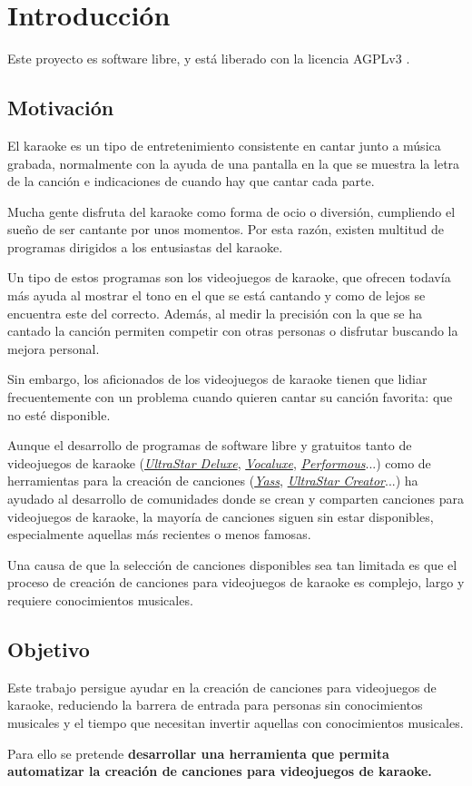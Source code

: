 \chapter{Introducción}

Este proyecto es software libre, y está liberado con la licencia AGPLv3 \cite{agpl}.

\section{Motivación}

El karaoke es un tipo de entretenimiento consistente en cantar junto a música grabada, normalmente con la ayuda de una pantalla en la que se muestra la letra de la canción e indicaciones de cuando hay que cantar cada parte.

Mucha gente disfruta del karaoke como forma de ocio o diversión, cumpliendo el sueño de ser cantante por unos momentos. Por esta razón, existen multitud de programas dirigidos a los entusiastas del karaoke.

Un tipo de estos programas son los videojuegos de karaoke, que ofrecen todavía más ayuda al mostrar el tono en el que se está cantando y como de lejos se encuentra este del correcto. Además, al medir la precisión con la que se ha cantado la canción permiten competir con otras personas o disfrutar buscando la mejora personal.

Sin embargo, los aficionados de los videojuegos de karaoke tienen que lidiar frecuentemente con un problema cuando quieren cantar su canción favorita: que no esté disponible.

Aunque el desarrollo de programas de software libre y gratuitos tanto de videojuegos de karaoke (\href{https://github.com/UltraStar-Deluxe/USDX}{\textit{UltraStar Deluxe}}, \href{https://github.com/Vocaluxe/Vocaluxe}{\textit{Vocaluxe}}, \href{https://github.com/performous/performous}{\textit{Performous}}...) como de herramientas para la creación de canciones (\href{https://github.com/sarutasan72/Yass}{\textit{Yass}}, \href{https://github.com/UltraStar-Deluxe/UltraStar-Creator}{\textit{UltraStar Creator}}...) ha ayudado al desarrollo de comunidades donde se crean y comparten canciones para videojuegos de karaoke, la mayoría de canciones siguen sin estar disponibles, especialmente aquellas más recientes o menos famosas.

Una causa de que la selección de canciones disponibles sea tan limitada es que el proceso de creación de canciones para videojuegos de karaoke es complejo, largo y requiere conocimientos musicales.


\section{Objetivo}

Este trabajo persigue ayudar en la creación de canciones para videojuegos de karaoke, reduciendo la barrera de entrada para personas sin conocimientos musicales y el tiempo que necesitan invertir aquellas con conocimientos musicales.


Para ello se pretende \textbf{desarrollar una herramienta que permita automatizar la creación de canciones para videojuegos de karaoke.}